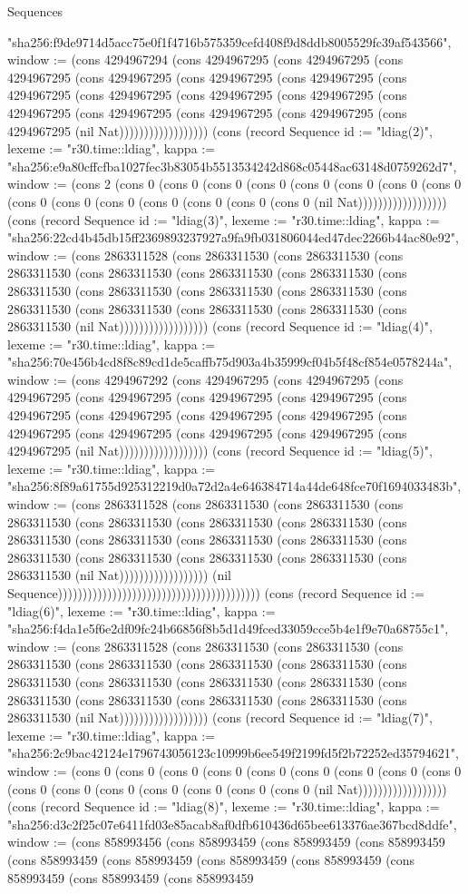 \begin{lexlean}{Sequences}
\begin{semanticmodule}
{"sha256:f9de9714d5acc75e0f1f4716b575359cefd408f9d8ddb8005529fc39af543566", window := (cons 4294967294 (cons 4294967295 (cons 4294967295 (cons 4294967295 (cons 4294967295 (cons 4294967295 (cons 4294967295 (cons 4294967295 (cons 4294967295 (cons 4294967295 (cons 4294967295 (cons 4294967295 (cons 4294967295 (cons 4294967295 (cons 4294967295 (cons 4294967295 (nil Nat)))))))))))))))))}) (cons (record Sequence {id := "ldiag(2)", lexeme := "r30.time::ldiag", kappa := "sha256:e9a80cffcfba1027fec3b83054b5513534242d868c05448ac63148d0759262d7", window := (cons 2 (cons 0 (cons 0 (cons 0 (cons 0 (cons 0 (cons 0 (cons 0 (cons 0 (cons 0 (cons 0 (cons 0 (cons 0 (cons 0 (cons 0 (cons 0 (nil Nat)))))))))))))))))}) (cons (record Sequence {id := "ldiag(3)", lexeme := "r30.time::ldiag", kappa := "sha256:22cd4b45db15ff2369893237927a9fa9fb031806044ed47dec2266b44ac80e92", window := (cons 2863311528 (cons 2863311530 (cons 2863311530 (cons 2863311530 (cons 2863311530 (cons 2863311530 (cons 2863311530 (cons 2863311530 (cons 2863311530 (cons 2863311530 (cons 2863311530 (cons 2863311530 (cons 2863311530 (cons 2863311530 (cons 2863311530 (cons 2863311530 (nil Nat)))))))))))))))))}) (cons (record Sequence {id := "ldiag(4)", lexeme := "r30.time::ldiag", kappa := "sha256:70e456b4cd8f8c89cd1de5caffb75d903a4b35999cf04b5f48cf854e0578244a", window := (cons 4294967292 (cons 4294967295 (cons 4294967295 (cons 4294967295 (cons 4294967295 (cons 4294967295 (cons 4294967295 (cons 4294967295 (cons 4294967295 (cons 4294967295 (cons 4294967295 (cons 4294967295 (cons 4294967295 (cons 4294967295 (cons 4294967295 (cons 4294967295 (nil Nat)))))))))))))))))}) (cons (record Sequence {id := "ldiag(5)", lexeme := "r30.time::ldiag", kappa := "sha256:8f89a61755d925312219d0a72d2a4e646384714a44de648fce70f1694033483b", window := (cons 2863311528 (cons 2863311530 (cons 2863311530 (cons 2863311530 (cons 2863311530 (cons 2863311530 (cons 2863311530 (cons 2863311530 (cons 2863311530 (cons 2863311530 (cons 2863311530 (cons 2863311530 (cons 2863311530 (cons 2863311530 (cons 2863311530 (cons 2863311530 (nil Nat)))))))))))))))))}) (nil Sequence))))))))))))))))))))))))))))))))))))))))) (cons (record Sequence {id := "ldiag(6)", lexeme := "r30.time::ldiag", kappa := "sha256:f4da1e5f6e2df09fc24b66856f8b5d1d49fced33059cce5b4e1f9e70a68755c1", window := (cons 2863311528 (cons 2863311530 (cons 2863311530 (cons 2863311530 (cons 2863311530 (cons 2863311530 (cons 2863311530 (cons 2863311530 (cons 2863311530 (cons 2863311530 (cons 2863311530 (cons 2863311530 (cons 2863311530 (cons 2863311530 (cons 2863311530 (cons 2863311530 (nil Nat)))))))))))))))))}) (cons (record Sequence {id := "ldiag(7)", lexeme := "r30.time::ldiag", kappa := "sha256:2c9bac42124e1796743056123c10999b6ee549f2199fd5f2b72252ed35794621", window := (cons 0 (cons 0 (cons 0 (cons 0 (cons 0 (cons 0 (cons 0 (cons 0 (cons 0 (cons 0 (cons 0 (cons 0 (cons 0 (cons 0 (cons 0 (cons 0 (nil Nat)))))))))))))))))}) (cons (record Sequence {id := "ldiag(8)", lexeme := "r30.time::ldiag", kappa := "sha256:d3c2f25c07e6411fd03e85acab8af0dfb610436d65bee613376ae367bcd8ddfe", window := (cons 858993456 (cons 858993459 (cons 858993459 (cons 858993459 (cons 858993459 (cons 858993459 (cons 858993459 (cons 858993459 (cons 858993459 (cons 858993459 (cons 858993459 }
\end{semanticmodule}
\end{lexlean}
